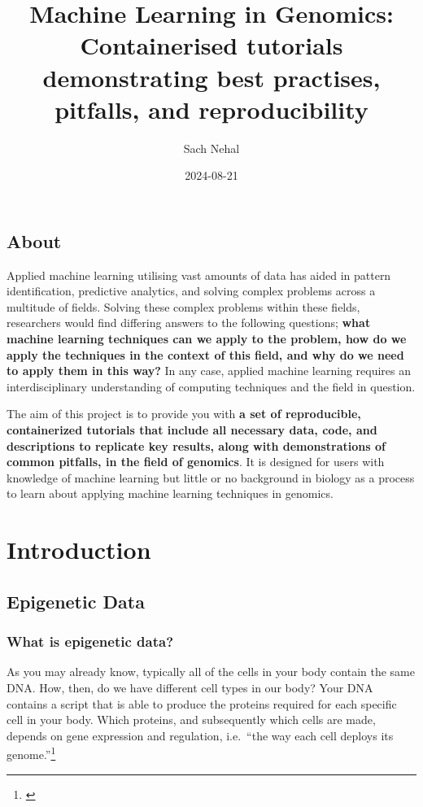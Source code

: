 \documentclass[
]{book}
\title{Machine Learning in Genomics: Containerised tutorials demonstrating best practises, pitfalls, and reproducibility}
\author{Sach Nehal}
\date{2024-08-21}
\begin{document}
\maketitle

{
\setcounter{tocdepth}{1}
\tableofcontents
}
\chapter*{About}\label{about}

Applied machine learning utilising vast amounts of data has aided in pattern identification, predictive analytics, and solving complex problems across a multitude of fields. Solving these complex problems within these fields, researchers would find differing answers to the following questions; \textbf{what machine learning techniques can we apply to the problem, how do we apply the techniques in the context of this field, and why do we need to apply them in this way?} In any case, applied machine learning requires an interdisciplinary understanding of computing techniques and the field in question.

The aim of this project is to provide you with \textbf{a set of reproducible, containerized tutorials that include all necessary data, code, and descriptions to replicate key results, along with demonstrations of common pitfalls, in the field of genomics}. It is designed for users with knowledge of machine learning but little or no background in biology as a process to learn about applying machine learning techniques in genomics.

\part{Introduction}\label{part-introduction}

\chapter{Epigenetic Data}\label{epigenetic-data}

\section{What is epigenetic data?}\label{what-is-epigenetic-data}

As you may already know, typically all of the cells in your body contain the same DNA. How, then, do we have different cell types in our body? Your DNA contains a script that is able to produce the proteins required for each specific cell in your body. Which proteins, and subsequently which cells are made, depends on gene expression and regulation, i.e.~``the way each cell deploys its genome.''\footnote{\citet{ralston2008}}
\end{document}

